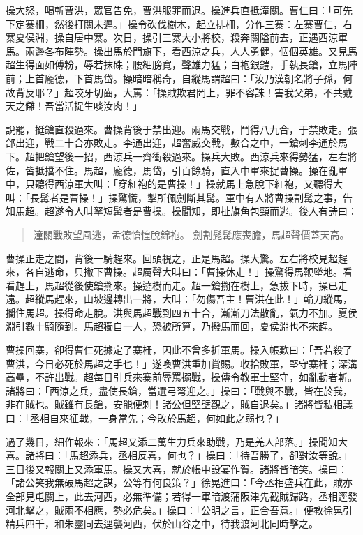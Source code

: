 操大怒，喝斬曹洪，眾官告免，曹洪服罪而退。操進兵直抵潼關。曹仁曰：「可先下定寨柵，然後打關未遲。」操令砍伐樹木，起立排柵，分作三寨：左寨曹仁，右寨夏侯淵，操自居中寨。次日，操引三寨大小將校，殺奔關隘前去，正遇西涼軍馬。兩邊各布陣勢。操出馬於門旗下，看西涼之兵，人人勇健，個個英雄。又見馬超生得面如傅粉，辱若抹硃；腰細膀寬，聲雄力猛；白袍銀鎧，手執長鎗，立馬陣前；上首龐德，下首馬岱。操暗暗稱奇，自縱馬謂超曰：「汝乃漢朝名將子孫，何故背反耶？」超咬牙切齒，大罵：「操賊欺君罔上，罪不容誅！害我父弟，不共戴天之讎！吾當活捉生啖汝肉！」

說罷，挺鎗直殺過來。曹操背後于禁出迎。兩馬交戰，鬥得八九合，于禁敗走。張郃出迎，戰二十合亦敗走。李通出迎，超奮威交戰，數合之中，一鎗刺李通於馬下。超把鎗望後一招，西涼兵一齊衝殺過來。操兵大敗。西涼兵來得勢猛，左右將佐，皆抵擋不住。馬超，龐德，馬岱，引百餘騎，直入中軍來捉曹操。操在亂軍中，只聽得西涼軍大叫：「穿紅袍的是曹操！」操就馬上急脫下紅袍，又聽得大叫：「長髯者是曹操！」操驚慌，掣所佩劍斷其髯。軍中有人將曹操割髯之事，告知馬超。超遂令人叫拏短髯者是曹操。操聞知，即扯旗角包頸而逃。後人有詩曰：

\begin{quote}
潼關戰敗望風逃，孟德愴惶脫錦袍。
劍割髭髯應喪膽，馬超聲價蓋天高。
\end{quote}

曹操正走之間，背後一騎趕來。回頭視之，正是馬超。操大驚。左右將校見超趕來，各自逃命，只撇下曹操。超厲聲大叫曰：「曹操休走！」操驚得馬鞭墜地。看看趕上，馬超從後使鎗搠來。操遶樹而走。超一鎗搠在樹上，急拔下時，操已走遠。超縱馬趕來，山坡邊轉出一將，大叫：「勿傷吾主！曹洪在此！」輪刀縱馬，攔住馬超。操得命走脫。洪與馬超戰到四五十合，漸漸刀法散亂，氣力不加。夏侯淵引數十騎隨到。馬超獨自一人，恐被所算，乃撥馬而回，夏侯淵也不來趕。

曹操回寨，卻得曹仁死據定了寨柵，因此不曾多折軍馬。操入帳歎曰：「吾若殺了曹洪，今日必死於馬超之手也！」遂喚曹洪重加賞賜。收拾敗軍，堅守寨柵；深溝高壘，不許出戰。超每日引兵來寨前辱罵搦戰，操傳令教軍士堅守，如亂動者斬。諸將曰：「西涼之兵，盡使長鎗，當選弓弩迎之。」操曰：「戰與不戰，皆在於我，非在賊也。賊雖有長鎗，安能便刺！諸公但堅壁觀之，賊自退矣。」諸將皆私相議曰：「丞相自來征戰，一身當先；今敗於馬超，何如此之弱也？」

過了幾日，細作報來：「馬超又添二萬生力兵來助戰，乃是羌人部落。」操聞知大喜。諸將曰：「馬超添兵，丞相反喜，何也？」操曰：「待吾勝了，卻對汝等說。」三日後又報關上又添軍馬。操又大喜，就於帳中設宴作賀。諸將皆暗笑。操曰：「諸公笑我無破馬超之謀，公等有何良策？」徐晃進曰：「今丞相盛兵在此，賊亦全部見屯關上，此去河西，必無準備；若得一軍暗渡蒲阪津先截賊歸路，丞相逕發河北擊之，賊兩不相應，勢必危矣。」操曰：「公明之言，正合吾意。」便教徐晃引精兵四千，和朱靈同去逕襲河西，伏於山谷之中，待我渡河北同時擊之。

